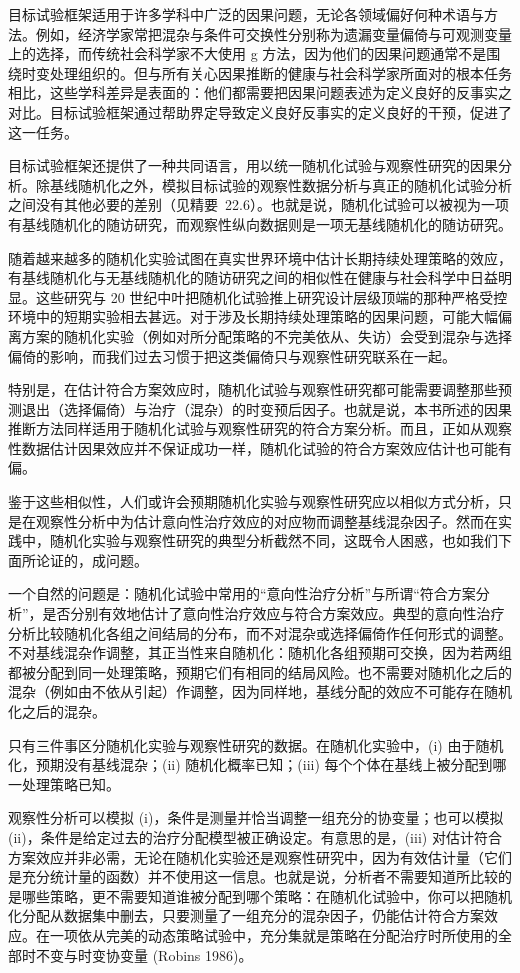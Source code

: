 目标试验框架适用于许多学科中广泛的因果问题，无论各领域偏好何种术语与方法。例如，经济学家常把混杂与条件可交换性分别称为遗漏变量偏倚与可观测变量上的选择，而传统社会科学家不大使用 g 方法，因为他们的因果问题通常不是围绕时变处理组织的。但与所有关心因果推断的健康与社会科学家所面对的根本任务相比，这些学科差异是表面的：他们都需要把因果问题表述为定义良好的反事实之对比。目标试验框架通过帮助界定导致定义良好反事实的定义良好的干预，促进了这一任务。

目标试验框架还提供了一种共同语言，用以统一随机化试验与观察性研究的因果分析。除基线随机化之外，模拟目标试验的观察性数据分析与真正的随机化试验分析之间没有其他必要的差别（见精要~22.6）。也就是说，随机化试验可以被视为一项有基线随机化的随访研究，而观察性纵向数据则是一项无基线随机化的随访研究。

随着越来越多的随机化实验试图在真实世界环境中估计长期持续处理策略的效应，有基线随机化与无基线随机化的随访研究之间的相似性在健康与社会科学中日益明显。这些研究与 20 世纪中叶把随机化试验推上研究设计层级顶端的那种严格受控环境中的短期实验相去甚远。对于涉及长期持续处理策略的因果问题，可能大幅偏离方案的随机化实验（例如对所分配策略的不完美依从、失访）会受到混杂与选择偏倚的影响，而我们过去习惯于把这类偏倚只与观察性研究联系在一起。

特别是，在估计符合方案效应时，随机化试验与观察性研究都可能需要调整那些预测退出（选择偏倚）与治疗（混杂）的时变预后因子。也就是说，本书所述的因果推断方法同样适用于随机化试验与观察性研究的符合方案分析。而且，正如从观察性数据估计因果效应并不保证成功一样，随机化试验的符合方案效应估计也可能有偏。

鉴于这些相似性，人们或许会预期随机化实验与观察性研究应以相似方式分析，只是在观察性分析中为估计意向性治疗效应的对应物而调整基线混杂因子。然而在实践中，随机化实验与观察性研究的典型分析截然不同，这既令人困惑，也如我们下面所论证的，成问题。

一个自然的问题是：随机化试验中常用的“意向性治疗分析”与所谓“符合方案分析”，是否分别有效地估计了意向性治疗效应与符合方案效应。典型的意向性治疗分析比较随机化各组之间结局的分布，而不对混杂或选择偏倚作任何形式的调整。不对基线混杂作调整，其正当性来自随机化：随机化各组预期可交换，因为若两组都被分配到同一处理策略，预期它们有相同的结局风险。也不需要对随机化之后的混杂（例如由不依从引起）作调整，因为同样地，基线分配的效应不可能存在随机化之后的混杂。

\begin{finepoint}[随机化实验与观察性研究的数据有何不同？]
只有三件事区分随机化实验与观察性研究的数据。在随机化实验中，(i) 由于随机化，预期没有基线混杂；(ii) 随机化概率已知；(iii) 每个个体在基线上被分配到哪一处理策略已知。

观察性分析可以模拟 (i)，条件是测量并恰当调整一组充分的协变量；也可以模拟 (ii)，条件是给定过去的治疗分配模型被正确设定。有意思的是，(iii) 对估计符合方案效应并非必需，无论在随机化实验还是观察性研究中，因为有效估计量（它们是充分统计量的函数）并不使用这一信息。也就是说，分析者不需要知道所比较的是哪些策略，更不需要知道谁被分配到哪个策略：在随机化试验中，你可以把随机化分配从数据集中删去，只要测量了一组充分的混杂因子，仍能估计符合方案效应。在一项依从完美的动态策略试验中，充分集就是策略在分配治疗时所使用的全部时不变与时变协变量 (Robins 1986)。
\end{finepoint}


